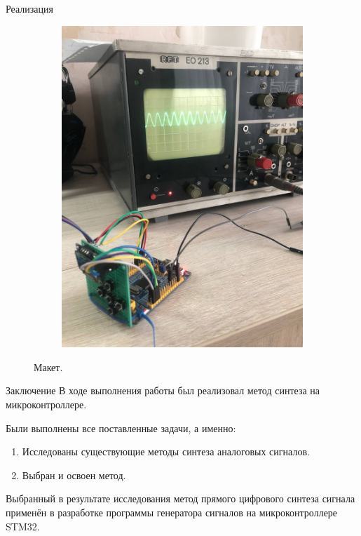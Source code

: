 \documentclass[10pt]{beamer}
\begin{document}
\begin{frame}{Реализация}
\begin{figure}
\begin{subfigure}[H]{0.45\textwidth}
         \includegraphics[width=\textwidth]{2}
     \end{subfigure}
        \caption{Макет.}
\end{figure}
\end{frame}


\begin{frame}{Заключение}
	В ходе выполнения работы был реализовал метод синтеза на микроконтроллере.
	
	Были выполнены все поставленные задачи, а именно:
	\begin{enumerate}
		\item Исследованы существующие методы синтеза аналоговых сигналов.
		\item Выбран и освоен метод.
	\end{enumerate}
	
	Выбранный в результате исследования метод прямого цифрового синтеза сигнала применён в разработке программы генератора сигналов на микроконтроллере STM32.
\end{frame}
\end{document}
